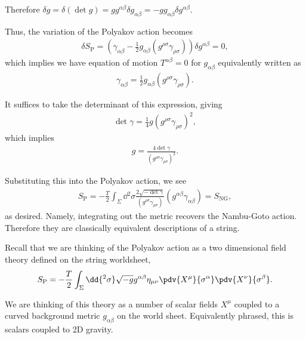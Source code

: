 Therefore $\delta g = \delta \left( \det g \right) = g g^{\alpha \beta} \delta g_{\alpha \beta} = -g g_{\alpha \beta} \delta g^{\alpha \beta}$. 

Thus, the variation of the Polyakov action becomes
\begin{align}
    \delta S_\text{P} = \left( \gamma_{\alpha \beta} - \frac{1}{2} g_{\alpha \beta} \left( g^{\rho \sigma} \gamma_{\rho \sigma} \right)  \right) \delta g^{\alpha \beta} = 0
,\end{align}
which implies we have equation of motion $T^{\alpha \beta} = 0$ for $g_{\alpha \beta}$ equivalently written as
\begin{align}
    \gamma_{\alpha \beta} = \frac{1}{2} g_{\alpha \beta} \left( g^{\rho \sigma} \gamma_{\rho \sigma} \right) 
.\end{align}

It suffices to take the determinant of this expression, giving
\begin{align}
    \det \gamma = \frac{1}{4} g \left( g^{\rho \sigma} \gamma_{\rho \sigma} \right)^2
,\end{align}
which implies
\begin{align}
    g = \frac{4 \det \gamma}{\left( g^{\rho \sigma} \gamma_{\rho \sigma} \right)^2}
.\end{align}

Substituting this into the Polyakov action, we see
\begin{align}
    S_\text{P} = -\frac{T}{2} \int_{\Sigma} \dd{^2\sigma} \frac{2 \sqrt{-\det \gamma} }{\left( g^{\rho \sigma} \gamma_{\rho \sigma} \right) } \left( g^{\alpha \beta} \gamma_{\alpha \beta} \right) = S_\text{NG}
,\end{align}
as desired. Namely, integrating out the metric recovers the Nambu-Goto action. Therefore they are classically equivalent descriptions of a string.

Recall that we are thinking of the Polyakov action as a two dimensional field theory defined on the string worldsheet,
\begin{align}
    S_\text{P} = -\frac{T}{2} \int_\Sigma \dd{^2 \sigma} \sqrt{-g}  g^{\alpha \beta} \eta_{\mu \nu} \pdv{X^{\mu}}{\sigma^{\alpha}} \pdv{X^{\nu}}{\sigma^{\beta}}
.\end{align}

We are thinking of this theory as a number of scalar fields $X^{\mu}$ coupled to a curved background metric $g_{\alpha \beta}$ on the world sheet. Equivalently phrased, this is scalars coupled to 2D gravity.

